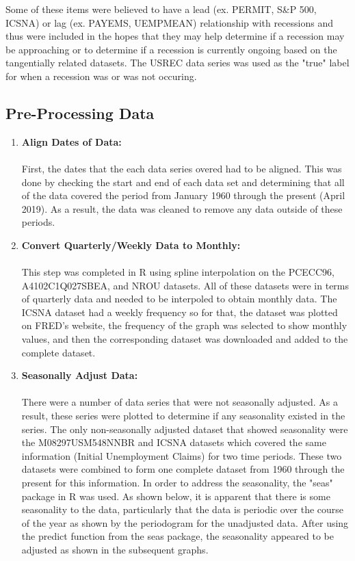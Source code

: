 \documentclass{article}
\begin{document}
Some of these items were believed to have a lead (ex. PERMIT, S\&P 500, ICSNA) or lag (ex. PAYEMS, UEMPMEAN) relationship with recessions and thus were included in the hopes that they may help determine if a recession may be approaching or to determine if a recession is currently ongoing based on the tangentially related datasets. The USREC data series was used as the "true" label for when a recession was or was not occuring.

\subsection{Pre-Processing Data}
\begin{enumerate}
	\item \textbf{Align Dates of Data:}  \\
	\\First, the dates that the each data series overed had to be aligned. This was done by checking the start and end of each data set and determining that all of the data covered the period from January 1960 through the present (April 2019). As a result, the data was cleaned to remove any data outside of these periods.
	\item \textbf{Convert Quarterly/Weekly Data to Monthly:}\\
	\\ This step was completed in R using spline interpolation on the PCECC96, A4102C1Q027SBEA, and NROU datasets. All of these datasets were in terms of quarterly data and needed to be interpoled to obtain monthly data. The ICSNA dataset had a weekly frequency so for that, the dataset was plotted on FRED's website, the frequency of the graph was selected to show monthly values, and then the corresponding dataset was downloaded and added to the complete dataset.
	\item \textbf{Seasonally Adjust Data:}\\
	\\ There were a number of data series that were not seasonally adjusted. As a result, these series were plotted to determine if any seasonality existed in the series. The only non-seasonally adjusted dataset that showed seasonality were the M08297USM548NNBR and ICSNA datasets which covered the same information (Initial Unemployment Claims) for two time periods. These two datasets were combined to form one complete dataset from 1960 through the present for this information. In order to address the seasonality, the "seas" package in R was used. As shown below, it is apparent that there is some seasonality to the data, particularly that the data is periodic over the course of the year as shown by the periodogram for the unadjusted data. After using the predict function from the seas package, the seasonality appeared to be adjusted as shown in the subsequent graphs.


\end{enumerate}
\end{document}
